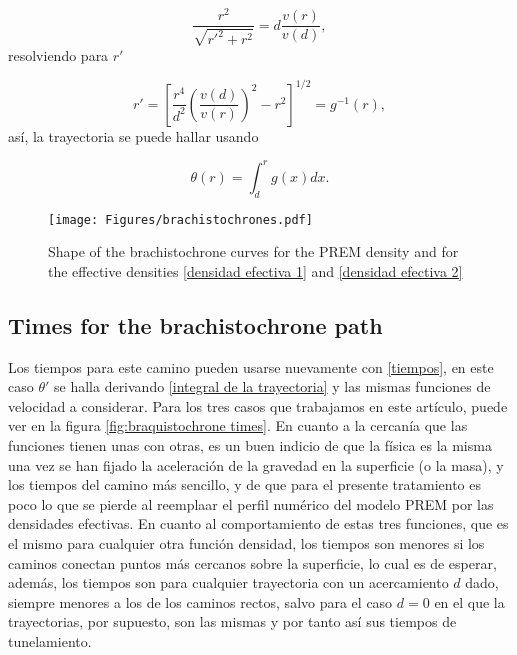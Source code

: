 \documentclass[aps,twocolumn,showpacs,preprintnumbers]{revtex4}
\begin{document}
            \begin{equation*}
                \frac{r^2}{\sqrt{{r'}^2 + r^2}} = d \frac{v(r)}{v(d)},
            \end{equation*}
            resolviendo para $r'$
            
            
            
            \begin{equation}
                r' = \left[ \frac{r^4 }{d^2} \left( \frac{v(d)}{v(r)} \right)^2 - r^2  \right]^{1/2} = g^{-1}(r),
                \label{función g de la trayectoria} 
            \end{equation}
            así, la trayectoria se puede hallar usando
            
            \begin{equation}
                \theta(r) = \int_{d}^{r} g(x) dx.
                \label{integral de la trayectoria}
            \end{equation}
    
    
            \begin{figure}
            \centering
            \texttt{[image: Figures/brachistochrones.pdf]}
            \caption{Shape of the brachistochrone curves for the PREM density and for the effective densities  \eqref{densidad efectiva 1} and \eqref{densidad efectiva 2}}
                \label{fig:braquistochrone}
            \end{figure}
    
        \subsection{Times for the brachistochrone path}
        
            Los tiempos para este camino pueden usarse nuevamente con \eqref{tiempos}, en este caso $\theta'$ se halla derivando \eqref{integral de la trayectoria} y  las mismas funciones de velocidad a considerar. Para los tres casos que trabajamos en este artículo, puede ver en la figura \ref{fig:braquistochrone times}. En cuanto a la cercanía que las funciones tienen unas con otras, es un buen indicio de que la física es la misma una vez se han fijado la aceleración de la gravedad en la superficie (o la masa), y los tiempos del camino más sencillo, y de que para el presente tratamiento es poco lo que se pierde al reemplaar el perfil numérico del modelo PREM por las densidades efectivas. En cuanto al comportamiento de estas tres funciones, que es el mismo para cualquier otra función densidad, los tiempos son menores si los caminos conectan puntos más cercanos sobre la superficie, lo cual es de esperar, además, los tiempos son para cualquier trayectoria con un acercamiento $d$ dado, siempre menores a los de los caminos rectos, salvo para el caso $d=0$ en el que la trayectorias, por supuesto, son las mismas y por tanto así sus tiempos de tunelamiento.
            
\end{document}
